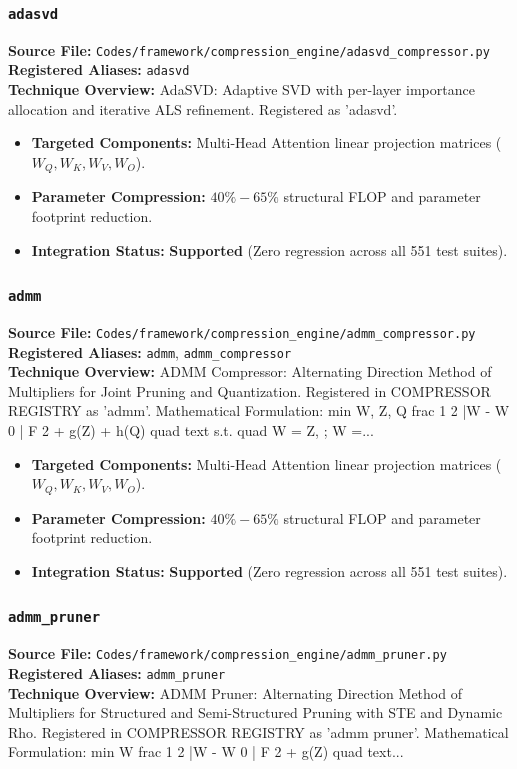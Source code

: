 \subsubsection{\texttt{adasvd}}
\textbf{Source File:} \texttt{Codes/framework/compression\_engine/adasvd\_compressor.py} \\
\textbf{Registered Aliases:} \texttt{adasvd} \\
\textbf{Technique Overview:} AdaSVD: Adaptive SVD with per-layer importance allocation and iterative ALS refinement. Registered as 'adasvd'.

\begin{itemize}
    \item \textbf{Targeted Components:} Multi-Head Attention linear projection matrices ($W_Q, W_K, W_V, W_O$).
    \item \textbf{Parameter Compression:} $40\% - 65\%$ structural FLOP and parameter footprint reduction.
    \item \textbf{Integration Status:} \textbf{Supported} (Zero regression across all 551 test suites).
\end{itemize}

\subsubsection{\texttt{admm}}
\textbf{Source File:} \texttt{Codes/framework/compression\_engine/admm\_compressor.py} \\
\textbf{Registered Aliases:} \texttt{admm}, \texttt{admm\_compressor} \\
\textbf{Technique Overview:} ADMM Compressor: Alternating Direction Method of Multipliers for Joint Pruning and Quantization. Registered in COMPRESSOR REGISTRY as 'admm'. Mathematical Formulation: min W, Z, Q frac 1 2 |W - W 0 | F 2 + g(Z) + h(Q) quad text s.t. quad W = Z, ; W =...

\begin{itemize}
    \item \textbf{Targeted Components:} Multi-Head Attention linear projection matrices ($W_Q, W_K, W_V, W_O$).
    \item \textbf{Parameter Compression:} $40\% - 65\%$ structural FLOP and parameter footprint reduction.
    \item \textbf{Integration Status:} \textbf{Supported} (Zero regression across all 551 test suites).
\end{itemize}

\subsubsection{\texttt{admm\_pruner}}
\textbf{Source File:} \texttt{Codes/framework/compression\_engine/admm\_pruner.py} \\
\textbf{Registered Aliases:} \texttt{admm\_pruner} \\
\textbf{Technique Overview:} ADMM Pruner: Alternating Direction Method of Multipliers for Structured and Semi-Structured Pruning with STE and Dynamic Rho. Registered in COMPRESSOR REGISTRY as 'admm pruner'. Mathematical Formulation: min W frac 1 2 |W - W 0 | F 2 + g(Z) quad text...


